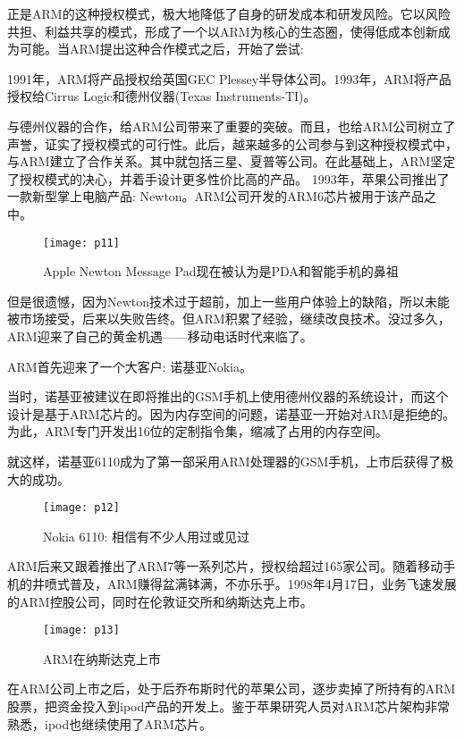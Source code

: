 \documentclass[utf8]{book}
\begin{document}
	正是ARM的这种授权模式，极大地降低了自身的研发成本和研发风险。它以风险共担、利益共享的模式，形成了一个以ARM为核心的生态圈，使得低成本创新成为可能。当ARM提出这种合作模式之后，开始了尝试: 

	1991年，ARM将产品授权给英国GEC Plessey半导体公司。1993年，ARM将产品授权给Cirrus Logic和德州仪器(Texas Instruments-TI)。

	与德州仪器的合作，给ARM公司带来了重要的突破。而且，也给ARM公司树立了声誉，证实了授权模式的可行性。此后，越来越多的公司参与到这种授权模式中，与ARM建立了合作关系。其中就包括三星、夏普等公司。在此基础上，ARM坚定了授权模式的决心，并着手设计更多性价比高的产品。
	1993年，苹果公司推出了一款新型掌上电脑产品: Newton。ARM公司开发的ARM6芯片被用于该产品之中。

	\begin{figure}[H]
	\centering
	\texttt{[image: p11]}
	\caption{Apple Newton Message Pad现在被认为是PDA和智能手机的鼻祖}
	\end{figure}
	

	但是很遗憾，因为Newton技术过于超前，加上一些用户体验上的缺陷，所以未能被市场接受，后来以失败告终。但ARM积累了经验，继续改良技术。没过多久，ARM迎来了自己的黄金机遇——移动电话时代来临了。

	ARM首先迎来了一个大客户: 诺基亚Nokia。

	当时，诺基亚被建议在即将推出的GSM手机上使用德州仪器的系统设计，而这个设计是基于ARM芯片的。因为内存空间的问题，诺基亚一开始对ARM是拒绝的。为此，ARM专门开发出16位的定制指令集，缩减了占用的内存空间。

	就这样，诺基亚6110成为了第一部采用ARM处理器的GSM手机，上市后获得了极大的成功。

	\begin{figure}[H]
	\centering
	\texttt{[image: p12]}
	\caption{Nokia 6110: 相信有不少人用过或见过}
	\end{figure}
	

	ARM后来又跟着推出了ARM7等一系列芯片，授权给超过165家公司。随着移动手机的井喷式普及，ARM赚得盆满钵满，不亦乐乎。1998年4月17日，业务飞速发展的ARM控股公司，同时在伦敦证交所和纳斯达克上市。

	\begin{figure}[H]
	\centering
	\texttt{[image: p13]}
	\caption{ARM在纳斯达克上市}
	\end{figure}
	

	在ARM公司上市之后，处于后乔布斯时代的苹果公司，逐步卖掉了所持有的ARM股票，把资金投入到ipod产品的开发上。鉴于苹果研究人员对ARM芯片架构非常熟悉，ipod也继续使用了ARM芯片。
\end{document}
